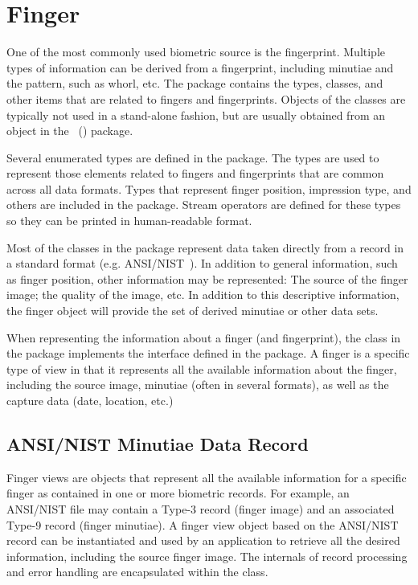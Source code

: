 %
%
\chapter{Finger}
\label{chp-finger}
One of the most commonly used biometric source is the fingerprint. Multiple
types of information can be derived from a fingerprint, including minutiae
and the pattern, such as whorl, etc. The  package contains the types,
classes, and other items that are related to fingers and fingerprints. Objects
of the  classes are typically not used in a stand-alone fashion, but are
usually obtained from an object in the
~() package.

Several enumerated types are defined in the  package. The types are used
to represent those elements related to fingers and fingerprints that are common
across all data formats. Types that represent finger position, impression type,
and others are included in the package. Stream operators are defined for these
types so they can be printed in human-readable format.

Most of the classes in the  package represent data taken directly from
a record in a standard format (e.g. ANSI/NIST~\cite{std:an2k}). In addition
to general information, such as finger position, other information may be
represented: The source of the finger image; the quality of the image, etc.
In addition to this descriptive information, the finger object will provide
the set of derived minutiae or other data sets.

When representing the information about a finger (and fingerprint), the class
in the  package implements the interface defined in the  package.
A finger is a specific type of view in that it represents all the available
information about the finger, including the source image, minutiae (often in
several formats), as well as the capture data (date, location, etc.)

\section{ANSI/NIST Minutiae Data Record}
\label{sec-an2kminutiaedatarecord}
Finger views are objects that represent all the available information for a
specific finger as contained in one or more biometric records. For example,
an ANSI/NIST file may contain a Type-3 record (finger image) and an associated
Type-9 record (finger minutiae). A finger view object based on the ANSI/NIST
record can be instantiated and used by an application to retrieve all the
desired information, including the source finger image. The internals of
record processing and error handling are encapsulated within the class.

